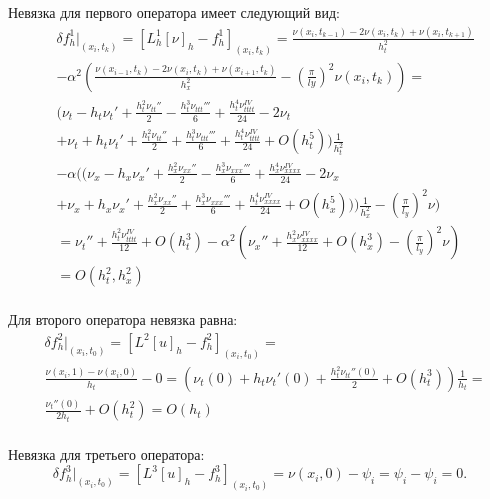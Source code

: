 {{		Невязка для первого оператора имеет следующий вид:
		\begin{align}
 &\delta f^1_h|_{ (x_i, t_k ) } = [ L^1_h[\nu]_h - f^1_h ]_{ (x_i, t_k ) } = \frac{\nu(x_i, t_{k-1})-2\nu(x_i, t_k)+\nu(x_i, t_{k+1})}{h^{2}_t}\nonumber\\
			 & - \alpha^2\left(\frac{\nu(x_{i-1}, t_{k})-2\nu(x_i, t_k)+\nu(x_{i+1}, t_{k})}{h^{2}_x} - \left(\frac{\pi}{ly}\right)^2\nu(x_i, t_k)\right) = \nonumber\\
			 & (\nu_t-h_t\nu_t'+\frac{h^2_t\nu_{tt}''}{2}-\frac{h^3_t\nu_{ttt}'''}{6}+\frac{h^4_t\nu_{tttt}^{IV}}{24}-2\nu_t\nonumber\\ 
			& + \nu_t+h_t\nu_t'+\frac{h^2_t\nu_{tt}''}{2}+\frac{h^3_t\nu_{ttt}'''}{6}+\frac{h^4_t\nu_{tttt}^{IV}}{24}+ O(h^5_t))\frac{1}{h^2_t}\nonumber\\ 
			 & -\alpha((\nu_x-h_x\nu_x'+\frac{h^2_x\nu_{xx}''}{2}-\frac{h^3_x\nu_{xxx}'''}{6}+\frac{h^4_x\nu_{xxxx}^{IV}}{24}-2\nu_x\nonumber\\ 
			& + \nu_x+h_x\nu_x'+\frac{h^2_x\nu_{xx}''}{2}+\frac{h^3_x\nu_{xxx}'''}{6}+\frac{h^4_t\nu_{xxxx}^{IV}}{24}+ O(h^5_x)))\frac{1}{h^2_x} - \left(\frac{\pi}{l_y}\right)^2 \nu)\nonumber\\ 		
			& = \nu_t'' + \frac{h^2_t\nu^{IV}_{tttt}}{12} + O(h^3_t) - \alpha^2\left(\nu_x'' + \frac{h^2_x\nu^{IV}_{xxxx}}{12} + O(h^3_x) -\left(\frac{\pi}{l_y}\right)^2 \nu\right)\nonumber\\
			&= O(h^2_t, h^2_x)\nonumber\\
		\end{align}
		
		Для второго оператора невязка равна:
		\begin{equation}
		\begin{split}
			&\delta f^2_h|_{ (x_i, t_0 ) } = [L^2[u]_h - f^2_h]_{ (x_i, t_0 ) } = \\
			&\frac{\nu(x_i, 1) - \nu(x_i, 0)}{h_t} - 0 = 
			\left(\nu_t(0)+h_t\nu_t'(0)+\frac{h^2_t\nu_{tt}''(0)}{2} + O(h^3_t)\right)\frac{1}{h_t} = \nonumber\\
			&\frac{\nu_t''(0)}{2h_t} + O(h^2_t) = O(h_t)\nonumber\\
		\end{split}
		\end{equation}

		Невязка для третьего оператора:
		\begin{equation}
			\delta f^3_h|_{ (x_i, t_0 ) } = [L^3[u]_h - f^3_h]_{ (x_i, t_0 ) } = \nu(x_i , 0) - \psi_i = \psi_i - \psi_i = 0\nonumber.
		\end{equation}
		
}}
